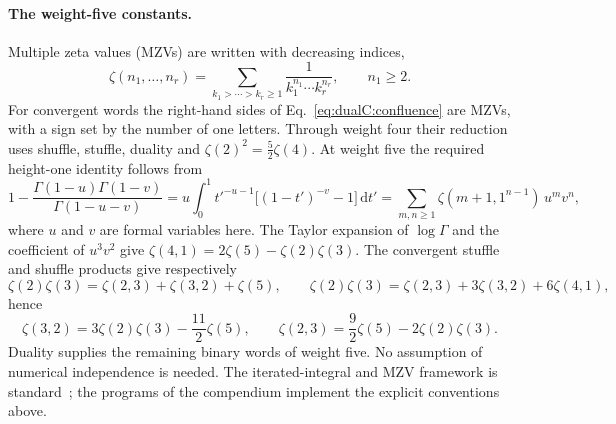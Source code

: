\documentclass[11pt,a4paper]{article}
\numberwithin{equation}{section}
\newcommand{\dd}{\,\mathrm d}
\begin{document}
\paragraph{The weight-five constants.} Multiple zeta values (MZVs) are written with decreasing indices,
\begin{equation}
 \zeta(n_1,\ldots,n_r)=\sum_{k_1>\cdots>k_r\ge1}\frac1{k_1^{n_1}\cdots k_r^{n_r}},\qquad n_1\ge2.
\end{equation}
For convergent words the right-hand sides of Eq.~\eqref{eq:dualC:confluence} are MZVs, with a sign set by the number of
one letters. Through weight four their reduction uses shuffle, stuffle, duality and $\zeta(2)^2=\frac52\zeta(4)$. At
weight five the required height-one identity follows from
\begin{equation}
 1-\frac{\Gamma(1-u)\Gamma(1-v)}{\Gamma(1-u-v)}
 =u\int_0^1t'^{-u-1}\bigl[(1-t')^{-v}-1\bigr]\dd t'
 =\sum_{m,n\ge1}\zeta(m+1,1^{n-1})\,u^mv^n,
 \label{eq:dualC:heightone}
\end{equation}
where $u$ and $v$ are formal variables here. The Taylor expansion of $\log\Gamma$ and the coefficient of $u^3v^2$
give $\zeta(4,1)=2\zeta(5)-\zeta(2)\zeta(3)$. The convergent stuffle and shuffle products give respectively
\begin{equation}
 \zeta(2)\zeta(3)=\zeta(2,3)+\zeta(3,2)+\zeta(5),\qquad
 \zeta(2)\zeta(3)=\zeta(2,3)+3\zeta(3,2)+6\zeta(4,1),
\end{equation}
hence
\begin{equation}
 \zeta(3,2)=3\zeta(2)\zeta(3)-\frac{11}{2}\zeta(5),\qquad
 \zeta(2,3)=\frac92\zeta(5)-2\zeta(2)\zeta(3).
\end{equation}
Duality supplies the remaining binary words of weight five. No assumption of numerical independence is needed. The
iterated-integral and MZV framework is standard~\cite{Brown:2011uzk,Brown:2013depth}; the programs of the compendium
implement the explicit conventions above.
\end{document}
